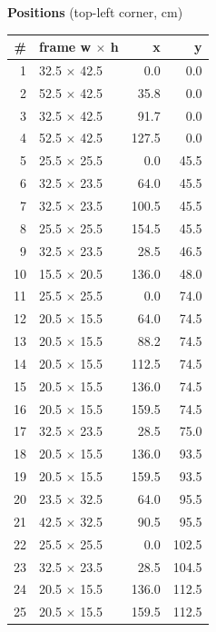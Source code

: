 \documentclass[a4paper,landscape,10pt]{article}
\begin{document}
\begin{minipage}[t]{0.25\textwidth}
\vspace{8pt}
{\bfseries Positions} (top-left corner, cm)\\[2pt]
\tiny
\begin{tabular}{@{}r l r r@{}}
\toprule
\# & frame w $\times$ h & x & y \\
\midrule
1 & 32.5 $\times$ 42.5 & 0.0 & 0.0 \\
2 & 52.5 $\times$ 42.5 & 35.8 & 0.0 \\
3 & 32.5 $\times$ 42.5 & 91.7 & 0.0 \\
4 & 52.5 $\times$ 42.5 & 127.5 & 0.0 \\
5 & 25.5 $\times$ 25.5 & 0.0 & 45.5 \\
6 & 32.5 $\times$ 23.5 & 64.0 & 45.5 \\
7 & 32.5 $\times$ 23.5 & 100.5 & 45.5 \\
8 & 25.5 $\times$ 25.5 & 154.5 & 45.5 \\
9 & 32.5 $\times$ 23.5 & 28.5 & 46.5 \\
10 & 15.5 $\times$ 20.5 & 136.0 & 48.0 \\
11 & 25.5 $\times$ 25.5 & 0.0 & 74.0 \\
12 & 20.5 $\times$ 15.5 & 64.0 & 74.5 \\
13 & 20.5 $\times$ 15.5 & 88.2 & 74.5 \\
14 & 20.5 $\times$ 15.5 & 112.5 & 74.5 \\
15 & 20.5 $\times$ 15.5 & 136.0 & 74.5 \\
16 & 20.5 $\times$ 15.5 & 159.5 & 74.5 \\
17 & 32.5 $\times$ 23.5 & 28.5 & 75.0 \\
18 & 20.5 $\times$ 15.5 & 136.0 & 93.5 \\
19 & 20.5 $\times$ 15.5 & 159.5 & 93.5 \\
20 & 23.5 $\times$ 32.5 & 64.0 & 95.5 \\
21 & 42.5 $\times$ 32.5 & 90.5 & 95.5 \\
22 & 25.5 $\times$ 25.5 & 0.0 & 102.5 \\
23 & 32.5 $\times$ 23.5 & 28.5 & 104.5 \\
24 & 20.5 $\times$ 15.5 & 136.0 & 112.5 \\
25 & 20.5 $\times$ 15.5 & 159.5 & 112.5 \\
\bottomrule
\end{tabular}
\end{minipage}
\clearpage
\end{document}
